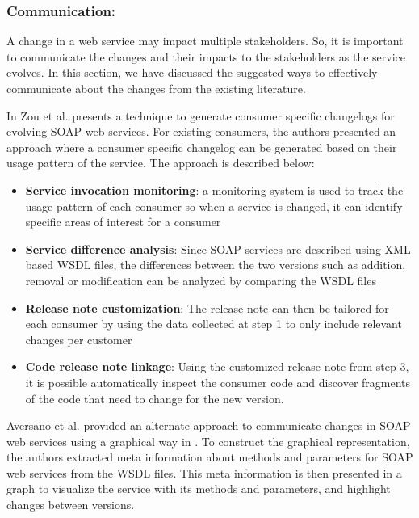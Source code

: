 \documentclass[runningheads,a4paper]{llncs}
\begin{document}
\subsubsection{Communication:}
A change in a web service may impact multiple stakeholders. So, it is important to communicate the changes and their impacts to the stakeholders as the service evolves. In this section, we have discussed the suggested ways to effectively communicate about the changes from the existing literature.

In \cite{le2008synchronizing} Zou et al. presents a technique to generate consumer specific changelogs for evolving SOAP web services. For existing consumers, the authors presented an approach where a consumer specific changelog can be generated based on their usage pattern of the service. The approach is described below:

\begin{itemize}
  \item \textbf{Service invocation monitoring}: a monitoring system is used to track the usage pattern of each consumer so when a service is changed, it can identify specific areas of interest for a consumer
  \item \textbf{Service difference analysis}: Since SOAP services are described using XML based WSDL files, the differences between the two versions such as addition, removal or modification can be analyzed by comparing the WSDL files
  \item \textbf{Release note customization}: The release note can then be tailored for each consumer by using the data collected at step 1 to only include relevant changes per customer
  \item \textbf{Code release note linkage}: Using the customized release note from step 3, it is possible automatically inspect the consumer code and discover fragments of the code that need to change for the new version.
\end{itemize}

Aversano et al. provided an alternate approach to communicate changes in SOAP web services using a graphical way in \cite{aversano2005visualizing}. To construct the graphical representation, the authors extracted meta information about methods and parameters for SOAP web services from the WSDL files. This meta information is then presented in a graph to visualize the service with its methods and parameters, and highlight changes between versions.

\end{document}

